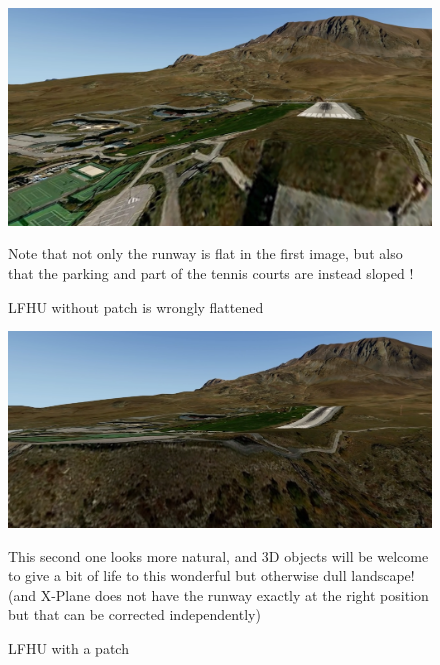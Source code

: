 \documentclass[12pt]{article}
\begin{document}
\begin{center}
\begin{figure}[!h]
\begin{center}
\includegraphics[width=16cm]{Images/LFHU_before.png}
\caption{\label{fig:LFHU_before}LFHU without patch is wrongly flattened}
\end{center}
Note that not only the runway is flat in the first image, but also that the parking and part
of the tennis courts are instead sloped !
\end{figure}
\end{center}
\begin{center}
\begin{figure}[!ht]
\begin{center}
\includegraphics[width=16cm]{Images/LFHU_after.png}
\caption{\label{fig:LFHU_after}LFHU with a patch}
\end{center}
This second one looks more natural, and 3D objects will be welcome to give a bit of life to this wonderful but otherwise dull landscape! (and X-Plane does not have the runway exactly at the right position but that can be corrected independently)
\end{figure}
\end{center}
\end{document}
